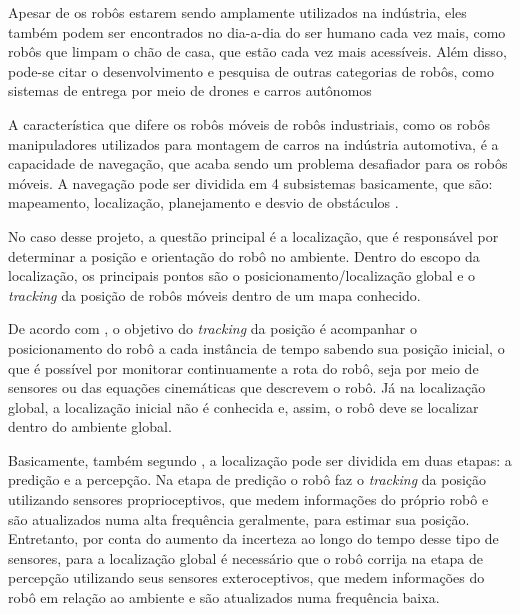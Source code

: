 \documentclass[acronym, symbols, table]{fei}
\begin{document}
	Apesar de os robôs estarem sendo amplamente utilizados na indústria, eles também podem ser encontrados no dia-a-dia do ser humano cada vez mais, como robôs que limpam o chão de casa, que estão cada vez mais acessíveis. Além disso, pode-se citar o desenvolvimento e pesquisa de outras categorias de robôs, como sistemas de entrega por meio de drones \cite{su14010360} e carros autônomos \cite{parekh2022review}
	
	A característica que difere os robôs móveis de robôs industriais, como os robôs manipuladores utilizados para montagem de carros na indústria automotiva, é a capacidade de navegação, que acaba sendo um problema desafiador para os robôs móveis. A navegação pode ser dividida em 4 subsistemas basicamente, que são: mapeamento, localização, planejamento e desvio de obstáculos \cite{app12146951}. 
	
	No caso desse projeto, a questão principal é a localização, que é responsável por determinar a posição e orientação do robô no ambiente. Dentro do escopo da localização, os principais pontos são o posicionamento/localização global e o \textit{tracking} da posição de robôs móveis dentro de um mapa conhecido.
	
	De acordo com \textcite{PANIGRAHI20226019}, o objetivo do \textit{tracking} da posição é acompanhar o posicionamento do robô a cada instância de tempo sabendo sua posição inicial, o que é possível por monitorar continuamente a rota do robô, seja por meio de sensores ou das equações cinemáticas que descrevem o robô. Já na localização global, a localização inicial não é conhecida e, assim, o robô deve se localizar dentro do ambiente global.
	
	
	Basicamente, também segundo \textcite{PANIGRAHI20226019}, a localização pode ser dividida em duas etapas: a predição e a percepção. Na etapa de predição o robô faz o \textit{tracking} da posição utilizando sensores proprioceptivos, que medem informações do próprio robô e são atualizados numa alta frequência geralmente, para estimar sua posição. Entretanto, por conta do aumento da incerteza ao longo do tempo desse tipo de sensores, para a localização global é necessário que o robô corrija na etapa de percepção utilizando seus sensores exteroceptivos, que medem informações do robô em relação ao ambiente e são atualizados numa frequência baixa.
	
\end{document}
